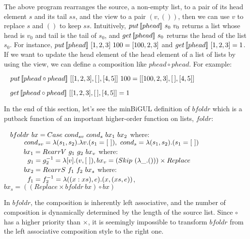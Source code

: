 The above program rearranges the source, a non-empty list, to a pair of its head element $s$ and its tail $ss$, and the view to a pair $(v, ())$, then we can use $v$ to replace $s$ and $()$ to keep $ss$. Intuitively, $put \, [\![phead]\!] \ s_0 \ v_0$ returns a list whose head is $v_0$ and tail is the tail of $s_0$, and $get \, [\![phead]\!] \ s_0$ returns the head of the list $s_0$. For instance, $put \, [\![phead]\!] \ [1,2,3] \ 100 = [100,2,3]$ and $get \, [\![phead]\!] \ [1,2,3] = 1$. If we want to update the head element of the head element of a list of lists by using the view, we can define a composition like $phead \circ phead$. For example:

\smallvspace
$\hspace*{3mm} put \, [\![phead \circ phead]\!] \ [[1,2,3],[\,],[4,5]] \ 100 = [[100,2,3],[\,],[4,5]]$

$\hspace*{3mm} get \, [\![phead \circ phead]\!] \ [[1,2,3],[\,],[4,5]] = 1$
\smallvspace

In the end of this section, let's see the minBiGUL definition of $bfoldr$ which is a putback function of an important higher-order function on lists, $foldr$:

\smallvspace
$\tab bfoldr \ bx = Case \ cond_{sv} \ cond_s \ bx_1 \ bx_2$ where:\\
$\tabs{3} \ cond_{sv} = \lambda (s_1,s_2).\lambda v.(s_1 = [\ ]), \ cond_s = \lambda (s_1,s_2).(s_1 = [\ ])$\\
$\tabs{3} \ bx_1 = RearrV \ g_1 \ g_2 \ bx_v$ where: \\
    $\tabs{4} g_1 = g_2^{-1} = \lambda [v].(v,[\ ]), bx_v = (Skip \ (\lambda \_.())) \times Replace$\\
$\tabs{3} \ bx_2 = RearrS \ f_1 \ f_2 \ bx_s$ where:\\
    $\tabs{4} f_1 = f_2^{-1} = \lambda ((x:xs),e).(x,(xs,e))$, 
$bx_s = ((Replace \times bfoldr \ bx) \circ bx)$
\smallvspace

\noindent In $bfoldr$, the composition is inherently left associative, and the number of composition is dynamically determined by the length of the source list. Since $\circ$ has a higher priority than $\times$, it is seemingly impossible to transform $bfoldr$ from the left associative composition style to the right one. 
